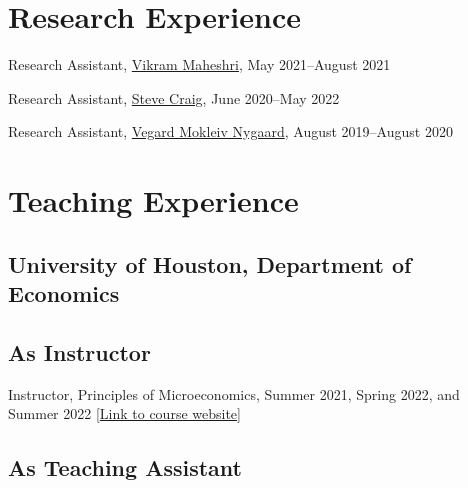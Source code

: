 \documentclass[10pt,letterpaper]{article}
\renewenvironment{itemize}{
  \begin{list}{}{
    \setlength{\leftmargin}{1.5em}
  }
}{
  \end{list}
}
\begin{document}
\begin{itemize}

\section*{Research Experience}

\begin{itemize}
  \item Research Assistant,
  \href{https://vmaheshri.github.io/}{Vikram Maheshri},
  May 2021--August 2021

  \item Research Assistant,
  \href{https://www.uh.edu/class/economics/people/current-faculty/steve/}{Steve Craig},
  June 2020--May 2022
  \item Research Assistant,
  \href{https://sites.google.com/site/vegardmokleivnygaard/}{Vegard Mokleiv Nygaard},
  August 2019--August 2020
\end{itemize}

\section*{Teaching Experience}
\subsection*{University of Houston, Department of Economics}

\subsection*{As Instructor}

\begin{itemize}

\item Instructor, Principles of Microeconomics, Summer 2021, Spring 2022, and Summer 2022 [\href{https://hussainhadah.com/courses/econ2304/}{Link to course website}]
\end{itemize}

\subsection*{As Teaching Assistant}

\begin{itemize}


\end{itemize}
\end{itemize}
\end{document}
